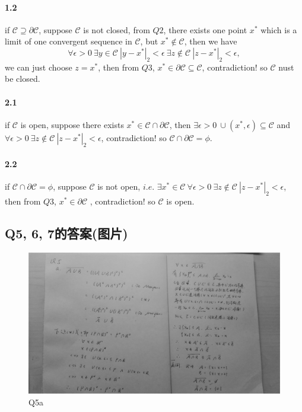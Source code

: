 \documentclass{article}
\begin{document}
  \paragraph{1.2} if $\mathcal{C} \supseteq \partial \mathcal{C}$, suppose $\mathcal{C}$ is not closed, from $Q2$, there exists one point $x^*$ which is a limit of one convergent sequence in $\mathcal{C}$, but $x^* \not\in \mathcal{C}$, then we have
  \begin{equation}
    \forall \epsilon > 0\ \exists y \in \mathcal{C}\ |y - x^*|_2 < \epsilon\ \exists z \not\in \mathcal{C}\ |z - x^*|_2 < \epsilon,
  \end{equation}
  we can just choose $z = x^*$, then from $Q3$, $x^* \in \partial \mathcal{C} \subseteq \mathcal{C}$, contradiction! so $\mathcal{C}$ nust be closed.
  \paragraph{2.1} if $\mathcal{C}$ is open, suppose there exists $x^* \in \mathcal{C} \cap \partial \mathcal{C}$, then $\exists \epsilon > 0\ \cup(x^*, \epsilon) \subseteq \mathcal{C}$ and $\forall \epsilon > 0\ \exists z \not\in \mathcal{C}\ |z - x^*|_2 < \epsilon$, contradiction! so $\mathcal{C} \cap \partial \mathcal{C} = \phi$.
  \paragraph{2.2} if $\mathcal{C} \cap \partial \mathcal{C} = \phi$, suppose $\mathcal{C}$ is not open, $i.e.$ $\exists x^* \in \mathcal{C}\  \forall \epsilon > 0\ \exists z \not\in \mathcal{C}\ |z - x^*|_2 < \epsilon$, then from $Q3$, $x^* \in \partial \mathcal{C}$
  , contradiction! so $\mathcal{C}$ is open.
\begin{CJK}{UTF8}{gbsn}
\section{Q5, 6, 7的答案(图片)}
\end{CJK}
\begin{figure}[ht]
  \centering
  \includegraphics[scale=0.1]{Q5.jpg}
  \caption{Q5a}
  \label{fig:label}
\end{figure}
\end{document}
